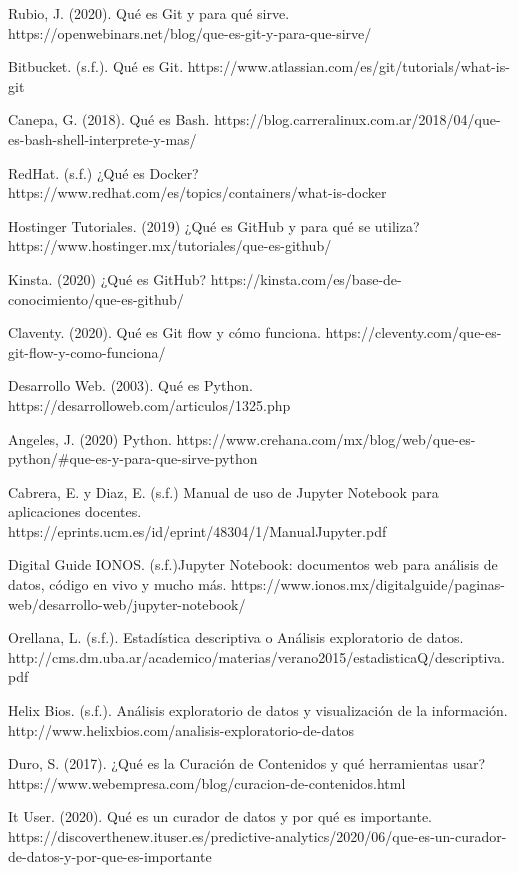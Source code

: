 \documentclass[12pt,letterpaper]{article}
\begin{document}
\begin{thebibliography}{99}

 Rubio, J. (2020). Qu\'e es Git y para qu\'e sirve. https://openwebinars.net/blog/que-es-git-y-para-que-sirve/

 Bitbucket. (s.f.). Qué es Git. https://www.atlassian.com/es/git/tutorials/what-is-git

 Canepa, G. (2018). Qué es Bash. https://blog.carreralinux.com.ar/2018/04/que-es-bash-shell-interprete-y-mas/

 RedHat. (s.f.) ¿Qué es Docker? https://www.redhat.com/es/topics/containers/what-is-docker

  Hostinger Tutoriales. (2019) ¿Qué es GitHub y para qué se utiliza? https://www.hostinger.mx/tutoriales/que-es-github/

 Kinsta. (2020) ¿Qué es GitHub? https://kinsta.com/es/base-de-conocimiento/que-es-github/

 Claventy. (2020). Qué es Git flow y cómo funciona. https://cleventy.com/que-es-git-flow-y-como-funciona/

 Desarrollo Web. (2003). Qué es Python. https://desarrolloweb.com/articulos/1325.php

 Angeles, J. (2020) Python. https://www.crehana.com/mx/blog/web/que-es-python/#que-es-y-para-que-sirve-python 

 Cabrera, E. y Diaz, E. (s.f.) Manual de uso de Jupyter Notebook para aplicaciones docentes. 
https://eprints.ucm.es/id/eprint/48304/1/ManualJupyter.pdf

 Digital Guide IONOS. (s.f.)Jupyter Notebook: documentos web para análisis de datos, código en vivo y mucho más. https://www.ionos.mx/digitalguide/paginas-web/desarrollo-web/jupyter-notebook/

 Orellana, L. (s.f.). Estadística descriptiva o Análisis exploratorio de datos. http://cms.dm.uba.ar/academico/materias/verano2015/estadisticaQ/descriptiva.pdf

 Helix Bios. (s.f.). Análisis exploratorio de datos y visualización de la información. http://www.helixbios.com/analisis-exploratorio-de-datos

 Duro, S. (2017). ¿Qué es la Curación de Contenidos y qué herramientas usar? https://www.webempresa.com/blog/curacion-de-contenidos.html

 It User. (2020). Qué es un curador de datos y por qué es importante. https://discoverthenew.ituser.es/predictive-analytics/2020/06/que-es-un-curador-de-datos-y-por-que-es-importante

\end{thebibliography} 
\end{document}
